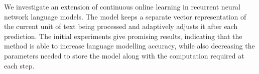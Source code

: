 We investigate an extension of continuous online learning in recurrent neural network language models. The model keeps a separate vector representation of the current unit of text being processed and adaptively adjusts it after each prediction. The initial experiments give promising results, indicating that the method is able to increase language modelling accuracy, while also decreasing the parameters needed to store the model along with the computation required at each step.
